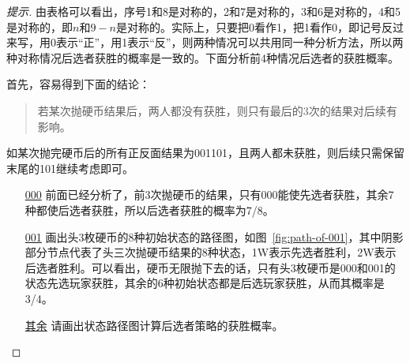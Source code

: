 \begin{proof}[提示]
  由表格可以看出，序号1和8是对称的，2和7是对称的，3和6是对称的，4和5是对称的，即$n$和$9-n$是对称的。实际上，只要把0看作1，把1看作0，即记号反过来写，用0表示“正”，用1表示“反”，则两种情况可以共用同一种分析方法，所以两种对称情况后选者获胜的概率是一致的。下面分析前4种情况后选者的获胜概率。

  首先，容易得到下面的结论：
  \begin{quotation}
    若某次抛硬币结果后，两人都没有获胜，则只有最后的3次的结果对后续有影响。
  \end{quotation}
  如某次抛完硬币后的所有正反面结果为001101，且两人都未获胜，则后续只需保留末尾的101继续考虑即可。
  
  \begin{enumerate}
  \item[\underline{000}] 前面已经分析了，前3次抛硬币的结果，只有000能使先选者获胜，其余7种都使后选者获胜，所以后选者获胜的概率为7/8。
  \item[\underline{001}] 画出头3枚硬币的8种初始状态的路径图，如图~\ref{fig:path-of-001}，其中阴影部分节点代表了头三次抛硬币结果的8种状态，1W表示先选者胜利，2W表示后选者胜利。可以看出，硬币无限抛下去的话，只有头3枚硬币是000和001的状态先选玩家获胜，其余的6种初始状态都是后选玩家获胜，从而其概率是3/4。
  \item[\underline{其余}] 请画出状态路径图计算后选者策略的获胜概率。
  \end{enumerate}
  \begin{figure}[htbp]
    \centering{}
\end{figure}
\end{proof}

